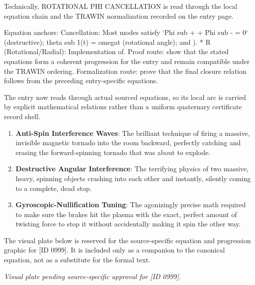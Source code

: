 Technically, ROTATIONAL PHI CANCELLATION is read through the local equation chain and the TRAWIN normalization recorded on the entry page.

Equation anchors: Cancellation: Most modes satisfy `Phi sub + + Phi sub - = 0` (destructive); theta sub 1(t) = omegat (rotational angle); and ). * R (Rotational/Radial): Implementation of. Proof route: show that the stated equations form a coherent progression for the entry and remain compatible under the TRAWIN ordering. Formalization route: prove that the final closure relation follows from the preceding entry-specific equations.

The entry now reads through actual sourced equations, so its local arc is carried by explicit mathematical relations rather than a uniform quaternary certificate record shell.
\endgroup

\begin{enumerate}[leftmargin=1.6em,itemsep=6pt,topsep=4pt]
\item \textbf{Anti-Spin Interference Waves}: The brilliant technique of firing a massive, invisible magnetic tornado into the room backward, perfectly catching and erasing the forward-spinning tornado that was about to explode.
\item \textbf{Destructive Angular Interference}: The terrifying physics of two massive, heavy, spinning objects crashing into each other and instantly, silently coming to a complete, dead stop.
\item \textbf{Gyroscopic-Nullification Tuning}: The agonizingly precise math required to make sure the brakes hit the plasma with the exact, perfect amount of twisting force to stop it without accidentally making it spin the other way.
\end{enumerate}

\begingroup\footnotesize\sloppy
The visual plate below is reserved for the source-specific equation and progression graphic for [ID 0999]. It is included only as a companion to the canonical equation, not as a substitute for the formal text.
\par\endgroup
\begingroup\footnotesize\itshape
Visual plate pending source-specific approval for [ID 0999].
\par\endgroup

